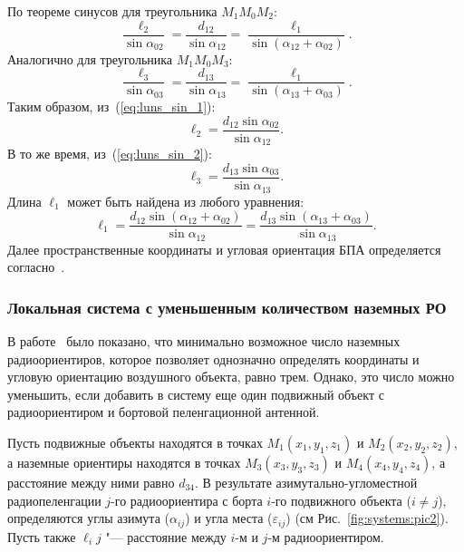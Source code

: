 \documentclass[../main.tex]{subfiles}
\begin{document}
По теореме синусов для треугольника $M_1 M_0 M_2$:
\begin{equation}\label{eq:luns_sin_1}
  \frac{\ell_2}{\sin\alpha_{02}} = \frac{d_{12}}{\sin\alpha_{12}} = \frac{\ell_1}{\sin\left(\alpha_{12} + \alpha_{02}\right)}.
\end{equation}
Аналогично для треугольника $M_1 M_0 M_3$:
\begin{equation}\label{eq:luns_sin_2}
    \frac{\ell_3}{\sin\alpha_{03}} = \frac{d_{13}}{\sin\alpha_{13}} = \frac{\ell_1}{\sin\left(\alpha_{13} + \alpha_{03}\right)}.
\end{equation}
Таким образом, из~(\ref{eq:luns_sin_1}):
\begin{equation*}
    \ell_2 = \frac{d_{12}\sin\alpha_{02}}{\sin\alpha_{12}}.
\end{equation*}
В то же время, из~(\ref{eq:luns_sin_2}):
\begin{equation*}
    \ell_3 = \frac{d_{13}\sin\alpha_{03}}{\sin\alpha_{13}}.
\end{equation*}
Длина $\ell_1$ может быть найдена из любого уравнения:
\begin{equation*}
    \ell_1 = \frac{d_{12}\sin\left(\alpha_{12} + \alpha_{02}\right)}{\sin\alpha_{12}} = \frac{d_{13}\sin\left(\alpha_{13} + \alpha_{03}\right)}{\sin\alpha_{13}}.
\end{equation*}
Далее пространственные координаты и угловая ориентация БПА определяется согласно~\cite{antennas}.

\subsubsection{Локальная система с уменьшенным количеством наземных РО}
В работе~\cite{antennas} было показано, что минимально возможное число наземных радиоориентиров, которое позволяет однозначно определять координаты и угловую ориентацию воздушного объекта, равно трем. Однако, это число можно уменьшить, если добавить в систему еще один подвижный объект с радиоориентиром и бортовой пеленгационной антенной.

Пусть подвижные объекты находятся в точках $M_1\left(x_1, y_1, z_1\right)$ и $M_2\left(x_2, y_2, z_2\right)$, а наземные ориентиры находятся в точках $M_3\left(x_3, y_3, z_3\right)$ и $M_4\left(x_4, y_4, z_4\right)$, а расстояние между ними равно $d_{34}$. В результате азимутально-угломестной радиопеленгации  $j$-го радиоориентира с борта $i$-го подвижного объекта ($i \ne j$), определяются углы азимута ($\alpha_{ij}$) и угла места ($\varepsilon_{ij}$) (см Рис.~\ref{fig:systems:pic2}). Пусть также $\ell_ij$ "--- расстояние между $i$-м и $j$-м радиоориентиром.
\end{document}
